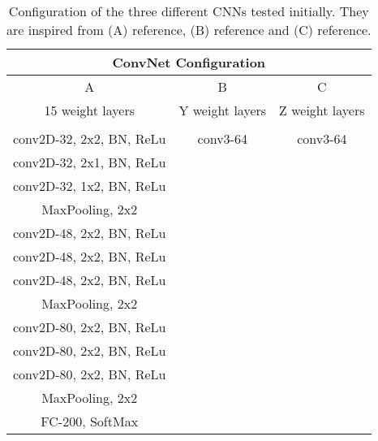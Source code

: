 \medskip
\begin{table}[htbp]
\begin{center}
\begin{tabular}{|c|c|c|}

  \hline
  \multicolumn{3}{|c|}{ConvNet Configuration} \\
  \hline

  A & B & C
  \\\hline

  15 weight layers & Y weight layers & Z weight layers
  \\\hhline{|=|=|=|}

  \multicolumn{3}{|c|}{input ($64\times64\;RGB\;image$)}
  \\\hline

  conv2D-32, 2x2, BN, ReLu & conv3-64 & conv3-64 \\
  conv2D-32, 2x1, BN, ReLu \\
  conv2D-32, 1x2, BN, ReLu  \\ \hline
  MaxPooling, 2x2
  \\\hline
  conv2D-48, 2x2, BN, ReLu \\
  conv2D-48, 2x2, BN, ReLu \\
  conv2D-48, 2x2, BN, ReLu\\ \hline
  MaxPooling, 2x2
  \\\hline
  conv2D-80, 2x2, BN, ReLu \\
  conv2D-80, 2x2, BN, ReLu \\
  conv2D-80, 2x2, BN, ReLu\\ \hline
  MaxPooling, 2x2
  \\\hline
  FC-200, SoftMax \\
  \hline
  \end{tabular}
\caption[]
{\small
  Configuration of the three different CNNs tested initially. They are inspired from (A) reference, (B) reference and (C) reference.
}
\label{table:3_configurations}
\end{center}
\end{table}
